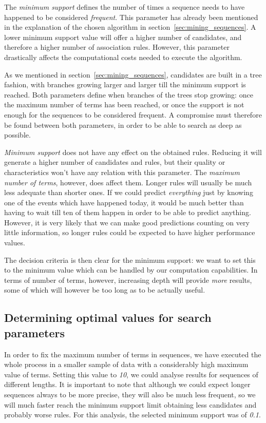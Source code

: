 \documentclass[a4paper,12pt]{article}
\begin{document}
The \emph{minimum support} defines the number of times a sequence needs to have happened to be considered \emph{frequent}. This parameter has already been mentioned in the explanation of the chosen algorithm in section~\ref{sec:mining_sequences}. A lower minimum support value will offer a higher number of candidates, and therefore a higher number of association rules. However, this parameter drastically affects the computational costs needed to execute the algorithm.

As we mentioned in section~\ref{sec:mining_sequences}, candidates are built in a tree fashion, with branches growing larger and larger till the minimum support is reached. Both parameters define when branches of the trees stop growing: once the maximum number of terms has been reached, or once the support is not enough for the sequences to be considered frequent. A compromise must therefore be found between both parameters, in order to be able to search as deep as possible.

\emph{Minimum support} does not have any effect on the obtained rules. Reducing it will generate a higher number of candidates and rules, but their quality or characteristics won't have any relation with this parameter. The \emph{maximum number of terms}, however, does affect them. Longer rules will usually be much less adequate than shorter ones. If we could predict \emph{everything} just by knowing one of the events which have happened today, it would be much better than having to wait till ten of them happen in order to be able to predict anything. However, it is very likely that we can make good predictions counting on very little information, so longer rules could be expected to have higher performance values.

The decision criteria is then clear for the minimum support: we want to set this to the minimum value which can be handled by our computation capabilities. In terms of number of terms, however, increasing depth will provide \emph{more} results, some of which will however be too long as to be actually useful.

\subsection{Determining optimal values for search parameters}
In order to fix the maximum number of terms in sequences, we have executed the whole process in a smaller sample of data with a considerably high maximum value of terms. Setting this value to \emph{10}, we could analyse results for sequences of different lengths. It is important to note that although we could expect longer sequences always to be more precise, they will also be much less frequent, so we will much faster reach the minimum support limit obtaining less candidates and probably worse rules. For this analysis, the selected minimum support was of \emph{0.1}.
\end{document}
